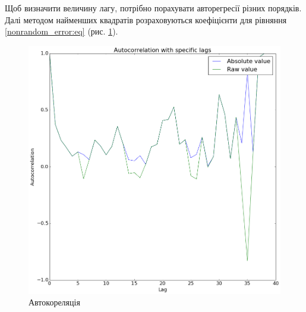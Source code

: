 Щоб визначити величину лагу, потрібно порахувати авторегресії різних порядків.
Далі методом найменших квадратів розраховуються коефіцієнти для рівняння
\eqref{nonrandom_error:eq} (рис. \ref{fig:error:autocorrelation}).
\begin{figure}[h!]
  \centering
  \includegraphics[width=\textwidth]{Coursework_files/Coursework_29_0.png}
  \caption{Автокореляція}
  \label{fig:error:autocorrelation}
\end{figure}

